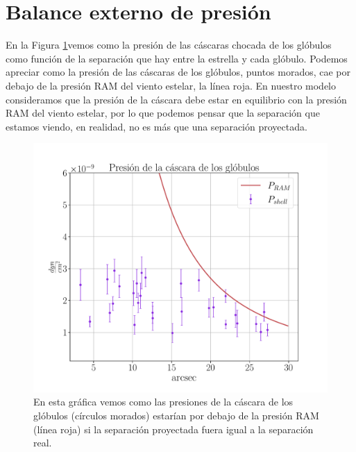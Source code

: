 \documentclass{book}
\begin{document}
\section{Balance externo de presión}\label{Sec:proyeccion}

En la Figura \ref{graf_presion}vemos como la presión de las cáscaras chocada de los glóbulos como función de la separación que hay entre la estrella y cada glóbulo. Podemos apreciar como la presión de las cáscaras de los glóbulos, puntos morados, cae por debajo de la presión RAM del viento estelar, la línea roja. En nuestro modelo consideramos que la presión de la cáscara debe estar en equilibrio con la presión RAM del viento estelar, por lo que podemos pensar que la separación que estamos viendo, en realidad, no es más que una separación proyectada. 

\begin{figure}[htb]
    \centering
    \includegraphics[width=\textwidth]{Nuevas imagenes finales/R_inf.pdf}
    \caption{En esta gráfica vemos como las presiones de la cáscara de los glóbulos (círculos morados) estarían por debajo de la presión RAM (línea roja) si la separación proyectada fuera igual a la separación real.}
    \label{graf_presion}
\end{figure}
\end{document}
